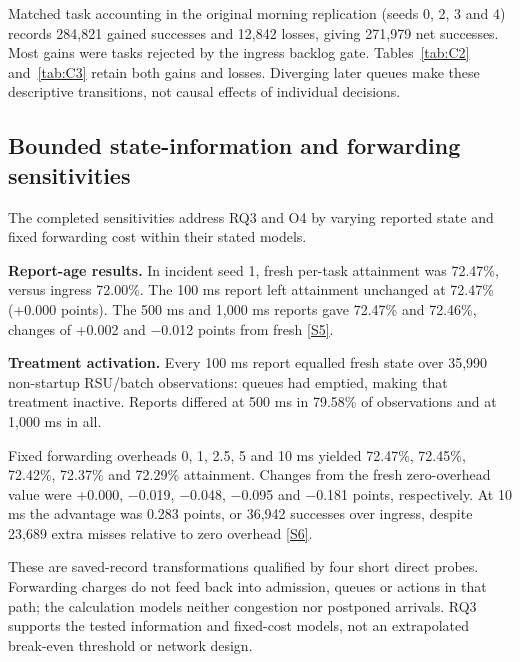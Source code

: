 \documentclass[12pt,a4paper]{article}
\begin{document}
Matched task accounting in the original morning replication (seeds 0, 2, 3 and 4) records 284,821 gained successes and 12,842 losses, giving 271,979 net successes. Most gains were tasks rejected by the ingress backlog gate. Tables~\ref{tab:C2} and~\ref{tab:C3} retain both gains and losses. Diverging later queues make these descriptive transitions, not causal effects of individual decisions.



\FloatBarrier
\subsection{Bounded state-information and forwarding sensitivities}\label{sec:3.6}

The completed sensitivities address RQ3 and O4 by varying reported state and fixed forwarding cost within their stated models.

\textbf{Report-age results.} In incident seed 1, fresh per-task attainment was 72.47\%, versus ingress 72.00\%. The 100 ms report left attainment unchanged at 72.47\% (+0.000 points). The 500 ms and 1,000 ms reports gave 72.47\% and 72.46\%, changes of +0.002 and \ensuremath{-}0.012 points from fresh \hyperref[source-s5]{[S5]}.

\textbf{Treatment activation.} Every 100 ms report equalled fresh state over 35,990 non-startup RSU/batch observations: queues had emptied, making that treatment inactive. Reports differed at 500 ms in 79.58\% of observations and at 1,000 ms in all.

Fixed forwarding overheads 0, 1, 2.5, 5 and 10 ms yielded 72.47\%, 72.45\%, 72.42\%, 72.37\% and 72.29\% attainment. Changes from the fresh zero-overhead value were +0.000, \ensuremath{-}0.019, \ensuremath{-}0.048, \ensuremath{-}0.095 and \ensuremath{-}0.181 points, respectively. At 10 ms the advantage was 0.283 points, or 36,942 successes over ingress, despite 23,689 extra misses relative to zero overhead \hyperref[source-s6]{[S6]}.

These are saved-record transformations qualified by four short direct probes. Forwarding charges do not feed back into admission, queues or actions in that path; the calculation models neither congestion nor postponed arrivals. RQ3 supports the tested information and fixed-cost models, not an extrapolated break-even threshold or network design.
\end{document}
